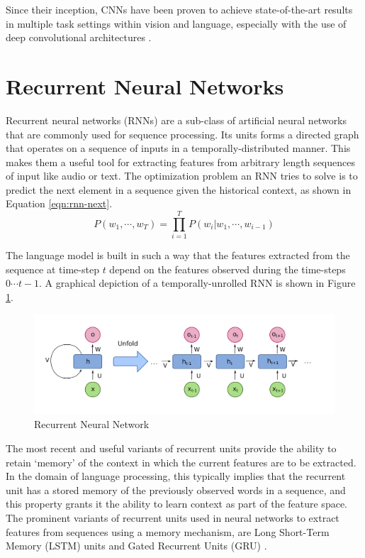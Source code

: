 Since their inception, CNNs have been proven to achieve state-of-the-art results in multiple task settings within vision and language, especially with the use of deep convolutional architectures \citep{lawrence1997face,krizhevsky2012imagenet,karpathy2014large,kalchbrenner2014convolutional,kim2014convolutional,hu2014convolutional}.


\section{Recurrent Neural Networks}

Recurrent neural networks (RNNs) are a sub-class of artificial neural networks that are commonly used for sequence processing. Its units forms a directed graph that operates on a sequence of inputs in a temporally-distributed manner. This makes them a useful tool for extracting features from arbitrary length sequences of input like audio or text. The optimization problem an RNN tries to solve is to predict the next element in a sequence given the historical context, as shown in Equation \ref{eqn:rnn-next}.
\begin{equation} \label{eqn:rnn-next}
	P(w_1, \cdots, w_T) = \prod_{i=1}^T P(w_i | w_1, \cdots, w_{i-1})
\end{equation}

The language model is built in such a way that the features extracted from the sequence at time-step $t$ depend on the features observed during the time-steps $0 \cdots t-1$. A graphical depiction of a temporally-unrolled RNN is shown in Figure \ref{fig:recurrent-neural-network-unfold}.

\begin{figure}[ht]
	\centering
	\includegraphics[width=\textwidth]{images/recurrent-neural-network-unfold}
	\caption{\label{fig:recurrent-neural-network-unfold} Recurrent Neural Network}
\end{figure}

The most recent and useful variants of recurrent units provide the ability to retain `memory' of the context in which the current features are to be extracted. In the domain of language processing, this typically implies that the recurrent unit has a stored memory of the previously observed words in a sequence, and this property grants it the ability to learn context as part of the feature space. The prominent variants of recurrent units used in neural networks to extract features from sequences using a memory mechanism, are Long Short-Term Memory (LSTM) units \citep{gers2001lstm} and Gated Recurrent Units (GRU) \citep{chung2014empirical}.


